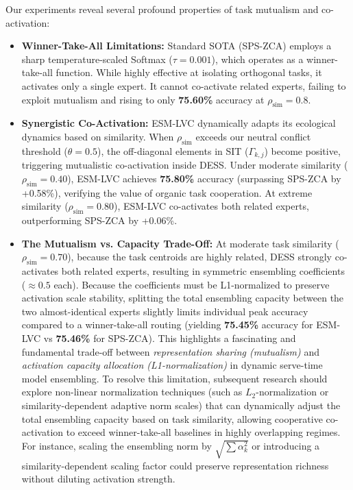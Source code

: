 Our experiments reveal several profound properties of task mutualism and co-activation:
\begin{itemize}
    \item \textbf{Winner-Take-All Limitations:} Standard SOTA (SPS-ZCA) employs a sharp temperature-scaled Softmax ($\tau = 0.001$), which operates as a winner-take-all function. While highly effective at isolating orthogonal tasks, it activates only a single expert. It cannot co-activate related experts, failing to exploit mutualism and rising to only \textbf{75.60\%} accuracy at $\rho_{\text{sim}} = 0.8$.
    \item \textbf{Synergistic Co-Activation:} ESM-LVC dynamically adapts its ecological dynamics based on similarity. When $\rho_{\text{sim}}$ exceeds our neutral conflict threshold ($\theta = 0.5$), the off-diagonal elements in SIT ($\Gamma_{k, j}$) become positive, triggering mutualistic co-activation inside DESS. Under moderate similarity ($\rho_{\text{sim}} = 0.40$), ESM-LVC achieves \textbf{75.80\%} accuracy (surpassing SPS-ZCA by +0.58\%), verifying the value of organic task cooperation. At extreme similarity ($\rho_{\text{sim}} = 0.80$), ESM-LVC co-activates both related experts, outperforming SPS-ZCA by +0.06\%.
    \item \textbf{The Mutualism vs. Capacity Trade-Off:} At moderate task similarity ($\rho_{\text{sim}} = 0.70$), because the task centroids are highly related, DESS strongly co-activates both related experts, resulting in symmetric ensembling coefficients ($\approx 0.5$ each). Because the coefficients must be L1-normalized to preserve activation scale stability, splitting the total ensembling capacity between the two almost-identical experts slightly limits individual peak accuracy compared to a winner-take-all routing (yielding \textbf{75.45\%} accuracy for ESM-LVC vs \textbf{75.46\%} for SPS-ZCA). This highlights a fascinating and fundamental trade-off between \emph{representation sharing (mutualism)} and \emph{activation capacity allocation (L1-normalization)} in dynamic serve-time model ensembling. To resolve this limitation, subsequent research should explore non-linear normalization techniques (such as $L_2$-normalization or similarity-dependent adaptive norm scales) that can dynamically adjust the total ensembling capacity based on task similarity, allowing cooperative co-activation to exceed winner-take-all baselines in highly overlapping regimes. For instance, scaling the ensembling norm by $\sqrt{\sum \alpha_k^2}$ or introducing a similarity-dependent scaling factor could preserve representation richness without diluting activation strength.
\end{itemize}

